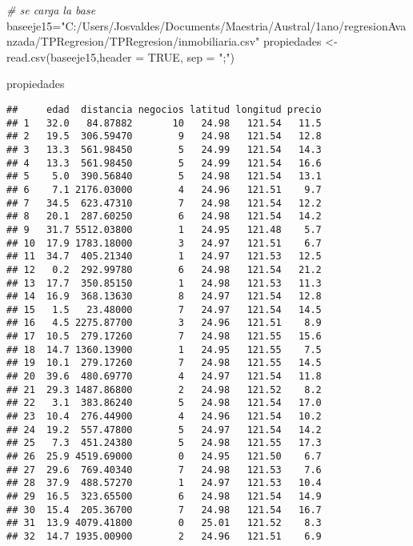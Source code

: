 \documentclass[
]{article}
\newenvironment{Shaded}{\begin{snugshade}}{\end{snugshade}}
\newcommand{\AttributeTok}[1]{\textcolor[rgb]{0.77,0.63,0.00}{#1}}
\newcommand{\CommentTok}[1]{\textcolor[rgb]{0.56,0.35,0.01}{\textit{#1}}}
\newcommand{\ConstantTok}[1]{\textcolor[rgb]{0.00,0.00,0.00}{#1}}
\newcommand{\FunctionTok}[1]{\textcolor[rgb]{0.00,0.00,0.00}{#1}}
\newcommand{\NormalTok}[1]{#1}
\newcommand{\OtherTok}[1]{\textcolor[rgb]{0.56,0.35,0.01}{#1}}
\newcommand{\StringTok}[1]{\textcolor[rgb]{0.31,0.60,0.02}{#1}}
\begin{document}
\begin{Shaded}
\begin{Highlighting}[]
\CommentTok{\# se carga la base}
\NormalTok{baseeje15}\OtherTok{=}\StringTok{"C:/Users/Josvaldes/Documents/Maestria/Austral/1ano/regresionAvanzada/TPRegresion/TPRegresion/inmobiliaria.csv"}
\NormalTok{propiedades }\OtherTok{\textless{}{-}} \FunctionTok{read.csv}\NormalTok{(baseeje15,}\AttributeTok{header =} \ConstantTok{TRUE}\NormalTok{, }\AttributeTok{sep =} \StringTok{";"}\NormalTok{)}

\NormalTok{propiedades}
\end{Highlighting}
\end{Shaded}

\begin{verbatim}
##     edad  distancia negocios latitud longitud precio
## 1   32.0   84.87882       10   24.98   121.54   11.5
## 2   19.5  306.59470        9   24.98   121.54   12.8
## 3   13.3  561.98450        5   24.99   121.54   14.3
## 4   13.3  561.98450        5   24.99   121.54   16.6
## 5    5.0  390.56840        5   24.98   121.54   13.1
## 6    7.1 2176.03000        4   24.96   121.51    9.7
## 7   34.5  623.47310        7   24.98   121.54   12.2
## 8   20.1  287.60250        6   24.98   121.54   14.2
## 9   31.7 5512.03800        1   24.95   121.48    5.7
## 10  17.9 1783.18000        3   24.97   121.51    6.7
## 11  34.7  405.21340        1   24.97   121.53   12.5
## 12   0.2  292.99780        6   24.98   121.54   21.2
## 13  17.7  350.85150        1   24.98   121.53   11.3
## 14  16.9  368.13630        8   24.97   121.54   12.8
## 15   1.5   23.48000        7   24.97   121.54   14.5
## 16   4.5 2275.87700        3   24.96   121.51    8.9
## 17  10.5  279.17260        7   24.98   121.55   15.6
## 18  14.7 1360.13900        1   24.95   121.55    7.5
## 19  10.1  279.17260        7   24.98   121.55   14.5
## 20  39.6  480.69770        4   24.97   121.54   11.8
## 21  29.3 1487.86800        2   24.98   121.52    8.2
## 22   3.1  383.86240        5   24.98   121.54   17.0
## 23  10.4  276.44900        4   24.96   121.54   10.2
## 24  19.2  557.47800        5   24.97   121.54   14.2
## 25   7.3  451.24380        5   24.98   121.55   17.3
## 26  25.9 4519.69000        0   24.95   121.50    6.7
## 27  29.6  769.40340        7   24.98   121.53    7.6
## 28  37.9  488.57270        1   24.97   121.53   10.4
## 29  16.5  323.65500        6   24.98   121.54   14.9
## 30  15.4  205.36700        7   24.98   121.54   16.7
## 31  13.9 4079.41800        0   25.01   121.52    8.3
## 32  14.7 1935.00900        2   24.96   121.51    6.9

\end{verbatim}
\end{document}

